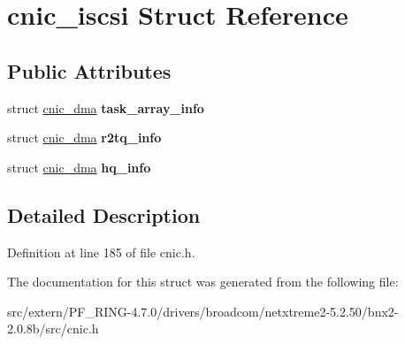 \hypertarget{structcnic__iscsi}{
\section{cnic\_\-iscsi Struct Reference}
\label{structcnic__iscsi}
}
\subsection*{Public Attributes}
\begin{DoxyCompactItemize}
\item 
\hypertarget{structcnic__iscsi_a49cda4b5087ac68fb7be8166f7babd2e}{
struct \hyperlink{structcnic__dma}{cnic\_\-dma} {\bfseries task\_\-array\_\-info}}
\label{structcnic__iscsi_a49cda4b5087ac68fb7be8166f7babd2e}

\item 
\hypertarget{structcnic__iscsi_a083d621775c9a834838218c87208fb9d}{
struct \hyperlink{structcnic__dma}{cnic\_\-dma} {\bfseries r2tq\_\-info}}
\label{structcnic__iscsi_a083d621775c9a834838218c87208fb9d}

\item 
\hypertarget{structcnic__iscsi_a6a34b9d8c9c14814d055562cff893a19}{
struct \hyperlink{structcnic__dma}{cnic\_\-dma} {\bfseries hq\_\-info}}
\label{structcnic__iscsi_a6a34b9d8c9c14814d055562cff893a19}

\end{DoxyCompactItemize}


\subsection{Detailed Description}


Definition at line 185 of file cnic.h.



The documentation for this struct was generated from the following file:\begin{DoxyCompactItemize}
\item 
src/extern/PF\_\-RING-\/4.7.0/drivers/broadcom/netxtreme2-\/5.2.50/bnx2-\/2.0.8b/src/cnic.h\end{DoxyCompactItemize}
